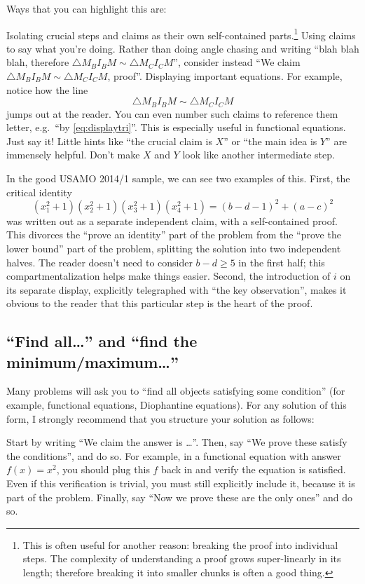 \documentclass[11pt]{scrartcl}
\begin{document}
Ways that you can highlight this are:
\begin{itemize}
  \ii \alert{Isolating crucial steps and claims}
  as their own self-contained parts.\footnote{This is often useful for another reason:
    breaking the proof into individual steps.
    The complexity of understanding a proof grows super-linearly
    in its length; therefore breaking it into smaller chunks
    is often a good thing.}
  \ii Using \alert{claims} to say what you're doing.
  Rather than doing angle chasing and writing
  ``blah blah blah, therefore $\triangle M_B I_B M \sim \triangle M_C I_C M$'',
  consider instead ``We claim $\triangle M_B I_B M \sim \triangle M_C I_C M$, proof''.
  \ii \alert{Displaying important equations}.
  For example, notice how the line
  \begin{equation}
    \triangle M_B I_B M \sim \triangle M_C I_C M
    \label{eq:displaytri}
  \end{equation}
  jumps out at the reader.
  You can even number such claims to reference them letter,
  e.g.\ ``by \eqref{eq:displaytri}''.
  This is especially useful in functional equations.
  \ii \alert{Just say it}!
  Little hints like ``the crucial claim is $X$''
  or ``the main idea is $Y$'' are immensely helpful.
  Don't make $X$ and $Y$ look like another intermediate step.
\end{itemize}

In the good USAMO 2014/1 sample, we can see two examples of this.
First, the critical identity
\[ (x_1^2+1)(x_2^2+1)(x_3^2+1)(x_4^2+1) = (b-d-1)^2 + (a-c)^2 \]
was written out as a separate independent claim, with a self-contained proof.
This divorces the ``prove an identity'' part of the problem from the
``prove the lower bound'' part of the problem,
splitting the solution into two independent halves.
The reader doesn't need to consider $b-d \geq 5$ in the first half;
this compartmentalization helps make things easier.
Second, the introduction of $i$ on its separate display,
explicitly telegraphed with ``the key observation'',
makes it obvious to the reader that this particular step is the heart of the proof.

\subsection{``Find all\dots'' and ``find the minimum/maximum\dots''}
Many problems will ask you to ``find all objects satisfying some condition''
(for example, functional equations, Diophantine equations).
For any solution of this form, I strongly recommend that you
structure your solution as follows:
\begin{itemize}
  \ii Start by writing ``\alert{We claim the answer is \dots}''.
  \ii Then, say ``\alert{We prove these satisfy the conditions}'', and do so.
  For example, in a functional equation with answer $f(x) = x^2$,
  you should plug this $f$ back in and verify the equation is satisfied.
  Even if this verification is trivial, you must still explicitly include it,
  because it is part of the problem.
  \ii Finally, say ``\alert{Now we prove these are the only ones}'' and do so.
\end{itemize}
\end{document}
